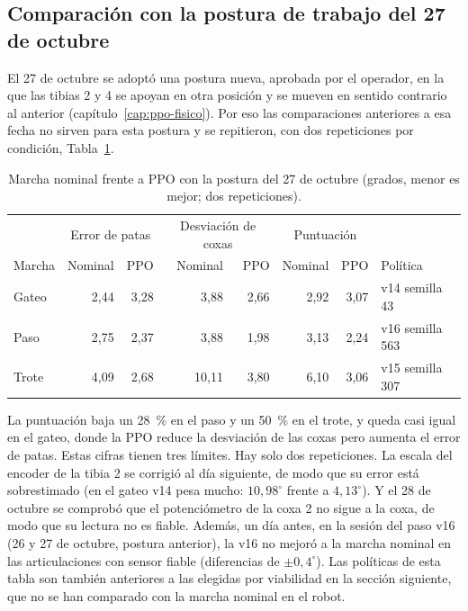 \subsection{Comparación con la postura de trabajo del 27 de octubre}
\label{sec:postura27}

El 27 de octubre se adoptó una postura nueva, aprobada por el operador, en la que
las tibias 2 y 4 se apoyan en otra posición y se mueven en sentido contrario al
anterior (capítulo~\ref{cap:ppo-fisico}). Por eso las comparaciones anteriores a
esa fecha no sirven para esta postura y se repitieron, con dos repeticiones por
condición, Tabla~\ref{tab:postura27}.

\begin{table}[H]
\centering
\caption{Marcha nominal frente a PPO con la postura del 27 de octubre (grados, menor es mejor; dos repeticiones).}
\label{tab:postura27}
\small
\begin{tabular}{lrrrrrrl}
\toprule
& \multicolumn{2}{c}{Error de patas} & \multicolumn{2}{c}{Desviación de coxas} & \multicolumn{2}{c}{Puntuación} & \\
Marcha & Nominal & PPO & Nominal & PPO & Nominal & PPO & Política \\
\midrule
Gateo & 2,44 & 3,28 & 3,88 & 2,66 & 2,92 & 3,07 & v14 semilla 43 \\
Paso & 2,75 & 2,37 & 3,88 & 1,98 & 3,13 & 2,24 & v16 semilla 563 \\
Trote & 4,09 & 2,68 & 10,11 & 3,80 & 6,10 & 3,06 & v15 semilla 307 \\
\bottomrule
\end{tabular}
\end{table}

La puntuación baja un 28~\% en el paso y un 50~\% en el trote, y queda casi igual en
el gateo, donde la PPO reduce la desviación de las coxas pero aumenta el error de
patas. Estas cifras tienen tres límites. Hay solo dos repeticiones. La escala del
encoder de la tibia 2 se corrigió al día siguiente, de modo que su error está
sobrestimado (en el gateo v14 pesa mucho: $10{,}98^\circ$ frente a
$4{,}13^\circ$). Y el 28 de octubre se comprobó que el potenciómetro de la coxa 2
no sigue a la coxa, de modo que su lectura no es fiable. Además, un día antes, en
la sesión del paso v16 (26 y 27 de octubre, postura anterior), la v16 no mejoró a
la marcha nominal en las articulaciones con sensor fiable (diferencias de
$\pm0{,}4^\circ$). Las políticas de esta tabla son también anteriores a las
elegidas por viabilidad en la sección siguiente, que no se han comparado con la
marcha nominal en el robot.

